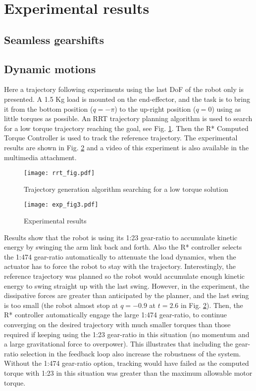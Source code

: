 \section{Experimental results}
\label{sec:ExperimentalResults}




\subsection{Seamless gearshifts}
\label{sec:SeamlessGearshifts}

\subsection{Dynamic motions}
\label{sec:DynamicMotions}


Here a trajectory following experiments using the last DoF of the robot only is presented. A 1.5 Kg load is mounted on the end-effector, and the task is to bring it from the bottom position ($q=-\pi$) to the up-right position ($q=0$) using as little torques as possible. An RRT trajectory planning algorithm is used to search for a low torque trajectory reaching the goal, see Fig. \ref{fig:exp_rrt}. Then the R* Computed Torque Controller is used to track the reference trajectory. The experimental results are shown in Fig. \ref{fig:exp_traj} and a video of this experiment is also available in the multimedia attachment. 
%
\begin{figure}[htp]
	\centering
		\texttt{[image: rrt\_fig.pdf]}
	\caption{Trajectory generation algorithm searching for a low torque solution}
	\label{fig:exp_rrt}
\end{figure}
%
\begin{figure}[htp]
	\centering
		\texttt{[image: exp\_fig3.pdf]}
	\caption{Experimental results}
	\label{fig:exp_traj}
	\vspace{-10pt}
\end{figure}
%
Results show that the robot is using its 1:23 gear-ratio to accumulate kinetic energy by swinging the arm link back and forth. Also the R* controller selects the 1:474 gear-ratio automatically to attenuate the load dynamics, when the actuator has to force the robot to stay with the trajectory.  Interestingly, the reference trajectory was planned so the robot would accumulate enough kinetic energy to swing straight up with the last swing. However, in the experiment, the dissipative forces are greater than anticipated by the planner, and the last swing is too small (the robot almost stop at $q=-0.9$ at $t=2.6$ in Fig. \ref{fig:exp_traj}). Then, the R* controller automatically engage the large 1:474 gear-ratio, to continue converging on the desired trajectory with much smaller torques than those required if keeping using the 1:23 gear-ratio in this situation (no momentum and a large gravitational force to overpower). This illustrates that including the gear-ratio selection in the feedback loop also increase the robustness of the system. Without the 1:474 gear-ratio option, tracking would have failed as the computed torque with 1:23 in this situation was greater than the maximum allowable motor torque.


